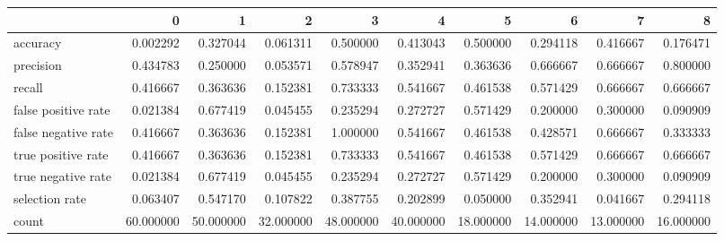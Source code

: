 \begin{tabular}{lrrrrrrrrr}
\toprule
{} &          0 &          1 &          2 &          3 &          4 &          5 &          6 &          7 &          8 \\
\midrule
accuracy            &   0.002292 &   0.327044 &   0.061311 &   0.500000 &   0.413043 &   0.500000 &   0.294118 &   0.416667 &   0.176471 \\
precision           &   0.434783 &   0.250000 &   0.053571 &   0.578947 &   0.352941 &   0.363636 &   0.666667 &   0.666667 &   0.800000 \\
recall              &   0.416667 &   0.363636 &   0.152381 &   0.733333 &   0.541667 &   0.461538 &   0.571429 &   0.666667 &   0.666667 \\
false positive rate &   0.021384 &   0.677419 &   0.045455 &   0.235294 &   0.272727 &   0.571429 &   0.200000 &   0.300000 &   0.090909 \\
false negative rate &   0.416667 &   0.363636 &   0.152381 &   1.000000 &   0.541667 &   0.461538 &   0.428571 &   0.666667 &   0.333333 \\
true positive rate  &   0.416667 &   0.363636 &   0.152381 &   0.733333 &   0.541667 &   0.461538 &   0.571429 &   0.666667 &   0.666667 \\
true negative rate  &   0.021384 &   0.677419 &   0.045455 &   0.235294 &   0.272727 &   0.571429 &   0.200000 &   0.300000 &   0.090909 \\
selection rate      &   0.063407 &   0.547170 &   0.107822 &   0.387755 &   0.202899 &   0.050000 &   0.352941 &   0.041667 &   0.294118 \\
count               &  60.000000 &  50.000000 &  32.000000 &  48.000000 &  40.000000 &  18.000000 &  14.000000 &  13.000000 &  16.000000 \\
\bottomrule
\end{tabular}
